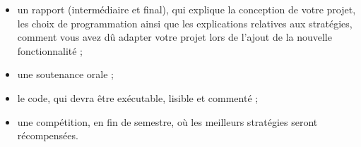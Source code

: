\begin{itemize}
    \item un rapport (intermédiaire et final), qui explique la conception de votre projet, les choix de programmation ainsi que les explications relatives aux stratégies, comment vous avez dû adapter votre projet lors de l'ajout de la nouvelle fonctionnalité ;
    \item une soutenance orale ;
    \item le code, qui devra être exécutable, lisible et commenté ;
    \item une compétition, en fin de semestre, où les meilleurs stratégies seront récompensées.
\end{itemize}


